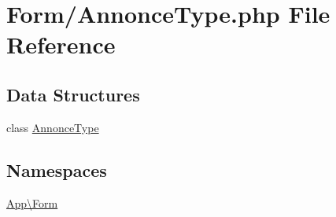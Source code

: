 \hypertarget{_annonce_type_8php}{}\section{Form/\+Annonce\+Type.php File Reference}
\label{_annonce_type_8php}
\subsection*{Data Structures}
\begin{DoxyCompactItemize}
\item 
class \mbox{\hyperlink{class_app_1_1_form_1_1_annonce_type}{Annonce\+Type}}
\end{DoxyCompactItemize}
\subsection*{Namespaces}
\begin{DoxyCompactItemize}
\item 
 \mbox{\hyperlink{namespace_app_1_1_form}{App\textbackslash{}\+Form}}
\end{DoxyCompactItemize}
